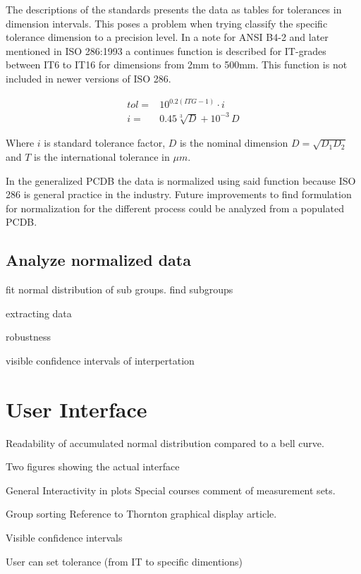 \documentclass[aip,amsmath, reprint, author-year]{revtex4-1}
\begin{document}
The descriptions of the standards presents the data as tables for tolerances in dimension intervals. This poses a problem when trying classify the specific tolerance dimension to a precision level.
In a note for ANSI B4-2  and later mentioned in ISO 286:1993 a continues function is described for IT-grades between IT6 to IT16 for dimensions from 2mm to 500mm. This function is not included in newer versions of ISO 286.

\begin{align}
	tol =& 10^{0.2 (ITG -1)} \cdot i \\
	i =& 0.45 \sqrt[3]{D} + 10^{-3} \, D 
\end{align}

Where $i$ is standard tolerance factor, $D$ is the nominal dimension $D = \sqrt{D_1 D_2}$ and $T$ is the international tolerance in $\mu m$.

In the generalized PCDB the data is normalized using said function because ISO 286 is general practice in the industry. Future improvements to find formulation for normalization for the different process could be analyzed from a populated PCDB.

\subsection{Analyze normalized data}



fit normal distribution of sub groups.
find subgroups

extracting data

robustness 



visible confidence intervals of interpertation


\section{User Interface}

Readability of accumulated normal distribution compared to a bell curve.

Two figures showing the actual interface

General
	Interactivity in plots 
		Special courses comment of measurement sets.
	
	Group sorting
		Reference to Thornton graphical display article.

	Visible confidence intervals

	User can set tolerance (from IT to specific dimentions)
\end{document}
